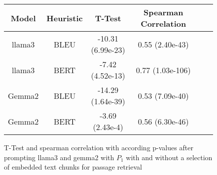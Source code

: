 \begin{figure}[H]
    \begin{center}
        \begin{tabular}{|c|c||c|c|c|c|}
            \hline
            Model  & Heuristic & T-Test            & Spearman Correlation \\ [0.5ex]
            \hline\hline
            llama3 & BLEU      & -10.31 (6.99e-23) & 0.55 (2.40e-43)      \\
            \hline
            llama3 & BERT      & -7.42 (4.52e-13)  & 0.77 (1.03e-106)     \\
            \hline
            Gemma2 & BLEU      & -14.29 (1.64e-39) & 0.53 (7.09e-40)      \\
            \hline
            Gemma2 & BERT      & -3.69 (2.43e-4)   & 0.56 (6.30e-46)      \\
            \hline
            \hline
        \end{tabular}
    \end{center}
    \label{fig:prompts2}
    \caption{T-Test and spearman correlation with according p-values after prompting llama3 and gemma2 with $P_{1}$ with and without a selection of embedded text chunks for passage retrieval}
\end{figure}


